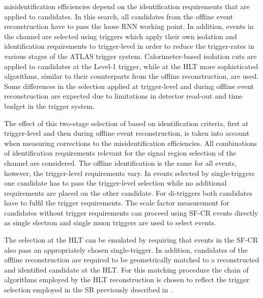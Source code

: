 \Jettotauhadvis misidentification efficiencies depend on the
identification requirements that are applied to \tauhadvis
candidates. In this search, all \tauhadvis candidates from the offline
event reconstruction have to pass the loose RNN \tauid working
point. In addition, events in the \hadhad channel are selected using
\tauhadvis triggers which apply their own isolation and identification
requirements to trigger-level \tauhadvis in order to reduce the
trigger-rates in various stages of the ATLAS trigger
system. Calorimeter-based isolation cuts are applied to \tauhadvis
candidates at the Level-1 trigger, while at the HLT more sophisticated
\tauid algorithms, similar to their counterparts from the offline
reconstruction, are used. Some differences in the selection applied at
trigger-level and during offline event reconstruction are expected due
to limitations in detector read-out and time budget in the trigger
system. %

The effect of this two-stage selection of \tauhadvis based on
identification criteria, first at trigger-level and then during
offline event reconstruction, is taken into account when measuring
corrections to the \jettotauhadvis misidentification efficiencies. All
combinations of \tauhadvis identification requirements relevant for
the signal region selection of the \hadhad channel are considered. The
offline \tauhadvis identification is the same for all events, however,
the trigger-level requirements vary. In events selected by
single-\tauhadvis triggers one \tauhadvis candidate has to pass the
trigger-level selection while no additional requirements are placed on
the other \tauhadvis candidate. For di-\tauhadvis triggers both
candidates have to fulfil the trigger requirements. The scale factor
measurement for \tauhadvis candidates without trigger requirements can
proceed using SF-CR events directly as single electron and single muon
triggers are used to select events.

The selection at the HLT can be emulated by requiring that events in
the SF-CR also pass an appropriately chosen single-\tauhadvis trigger.
In addition, \tauhadvis candidates of the offline \tauhadvis
reconstruction are required to be geometrically matched to a
reconstructed and identified \tauhadvis candidate at the HLT. For this
matching procedure the chain of algorithms employed by the HLT
\tauhadvis reconstruction is chosen to reflect the trigger selection
employed in the \hadhad SR previously described in
.

